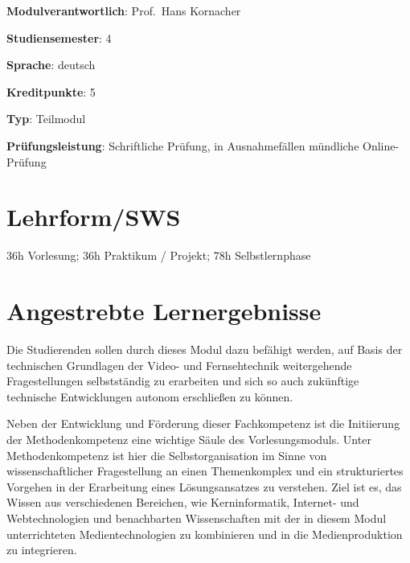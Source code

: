 \begin{modulHead}
\textbf{Modulverantwortlich}: Prof.~Hans
Kornacher
\end{modulHead}
\begin{modulHead}
\textbf{Studiensemester}:
4
\end{modulHead}
\begin{modulHead}
\textbf{Sprache}:
deutsch
\end{modulHead}
\begin{modulHead}
\textbf{Kreditpunkte}:
5
\end{modulHead}
\begin{modulHead}
\textbf{Typ}:
Teilmodul
\end{modulHead}
\begin{modulHead}
\textbf{Prüfungsleistung}:
Schriftliche Prüfung, in Ausnahmefällen mündliche
Online-Prüfung
\end{modulHead}


\hypertarget{lehrformswspathlabelmi-2017modulbeschreibungen-bachelorba_vc-audiovisuelle-medientechnik}{%
\section*{Lehrform/SWS\label{/mi-2017/modulbeschreibungen-bachelor/BA_VC-audiovisuelle-medientechnik}}\label{lehrformswspathlabelmi-2017modulbeschreibungen-bachelorba_vc-audiovisuelle-medientechnik}}

36h Vorlesung; 36h Praktikum / Projekt; 78h Selbstlernphase

\hypertarget{angestrebte-lernergebnissepathlabelmi-2017modulbeschreibungen-bachelorba_vc-audiovisuelle-medientechnik}{%
\section*{Angestrebte
Lernergebnisse\label{/mi-2017/modulbeschreibungen-bachelor/BA_VC-audiovisuelle-medientechnik}}\label{angestrebte-lernergebnissepathlabelmi-2017modulbeschreibungen-bachelorba_vc-audiovisuelle-medientechnik}}

Die Studierenden sollen durch dieses Modul dazu befähigt werden, auf
Basis der technischen Grundlagen der Video- und Fernsehtechnik
weitergehende Fragestellungen selbstständig zu erarbeiten und sich so
auch zukünftige technische Entwicklungen autonom erschließen zu können.

Neben der Entwicklung und Förderung dieser Fachkompetenz ist die
Initiierung der Methodenkompetenz eine wichtige Säule des
Vorlesungsmoduls. Unter Methodenkompetenz ist hier die
Selbstorganisation im Sinne von wissenschaftlicher Fragestellung an
einen Themenkomplex und ein strukturiertes Vorgehen in der Erarbeitung
eines Lösungsansatzes zu verstehen. Ziel ist es, das Wissen aus
verschiedenen Bereichen, wie Kerninformatik, Internet- und
Webtechnologien und benachbarten Wissenschaften mit der in diesem Modul
unterrichteten Medientechnologien zu kombinieren und in die
Medienproduktion zu integrieren.

